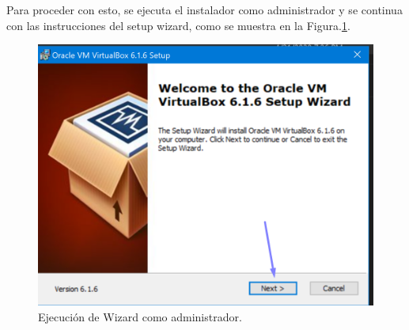 \documentclass[letterpaper, 12pt, oneside]{article}
\begin{document}
    Para proceder con esto, se ejecuta el instalador como administrador y se continua con las instrucciones del setup wizard, como se muestra en la Figura.\ref{fig:vbox3}.
    \begin{center}
    \begin{figure}[H]
        \includegraphics[scale=0.8]{img/install/virtualbox3.png}
        \caption{Ejecución de Wizard como administrador.}
        \label{fig:vbox3}
    \end{figure}    
    \end{center}
    
\end{document}
